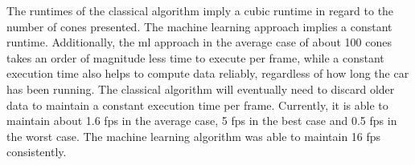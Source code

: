 $ $\\
The runtimes of the classical algorithm imply a cubic runtime in regard to the number of cones presented. The machine learning approach implies a constant runtime. Additionally, the \ac{ml} approach in the average case of about 100 cones takes an order of magnitude less time to execute per frame, while a constant execution time also helps to compute data reliably, regardless of how long the car has been running. The classical algorithm will eventually need to discard older data to maintain a constant execution time per frame. Currently, it is able to maintain about 1.6 \ac{fps} in the average case, 5 \ac{fps} in the best case and 0.5 \ac{fps} in the worst case. The machine learning algorithm was able to maintain 16 \ac{fps} consistently. 